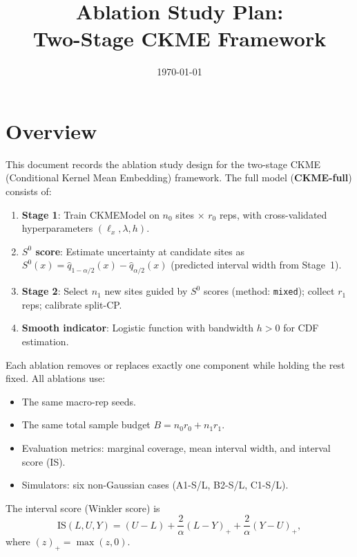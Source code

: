 \documentclass[11pt]{article}
\title{Ablation Study Plan: \\
       Two-Stage CKME Framework}
\author{}
\date{\today}
\begin{document}
\maketitle

\tableofcontents
\newpage

\section{Overview}

This document records the ablation study design for the two-stage CKME
(Conditional Kernel Mean Embedding) framework.
The full model (\textbf{CKME-full}) consists of:
\begin{enumerate}[noitemsep]
  \item \textbf{Stage 1}: Train CKMEModel on $n_0$ sites $\times$ $r_0$ reps,
        with cross-validated hyperparameters $(\ell_x, \lambda, h)$.
  \item \textbf{$S^0$ score}: Estimate uncertainty at candidate sites as
        $S^0(x) = \hat{q}_{1-\alpha/2}(x) - \hat{q}_{\alpha/2}(x)$
        (predicted interval width from Stage~1).
  \item \textbf{Stage 2}: Select $n_1$ new sites guided by $S^0$ scores
        (method: \texttt{mixed}); collect $r_1$ reps; calibrate split-CP.
  \item \textbf{Smooth indicator}: Logistic function with bandwidth $h > 0$
        for CDF estimation.
\end{enumerate}

Each ablation removes or replaces exactly one component while holding the rest
fixed.  All ablations use:
\begin{itemize}[noitemsep]
  \item The same macro-rep seeds.
  \item The same total sample budget
        $B = n_0 r_0 + n_1 r_1$.
  \item Evaluation metrics: marginal coverage, mean interval width,
        and interval score (IS).
  \item Simulators: six non-Gaussian cases
        (A1-S/L, B2-S/L, C1-S/L).
\end{itemize}

The interval score (Winkler score) is
\[
  \mathrm{IS}(L, U, Y) = (U - L)
  + \frac{2}{\alpha}(L - Y)_+
  + \frac{2}{\alpha}(Y - U)_+,
\]
where $(z)_+ = \max(z, 0)$.
\end{document}
